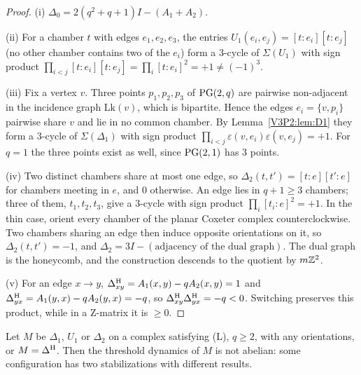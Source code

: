 \begin{proof}
(i) $\Delta_0=2(q^{2}+q+1)I-(A_1+A_2)$.

(ii) For a chamber $t$ with edges $e_1,e_2,e_3$, the entries $U_1(e_i,e_j)=[t:e_i][t:e_j]$
(no other chamber contains two of the $e_i$) form a $3$-cycle of $\Sigma(U_1)$ with sign
product $\prod_{i<j}[t:e_i][t:e_j]=\prod_i[t:e_i]^{2}=+1\neq(-1)^{3}$.

(iii) Fix a vertex $v$. Three points $p_1,p_2,p_3$ of $\mathrm{PG}(2,q)$ are pairwise non-adjacent
in the incidence graph $\mathrm{Lk}(v)$, which is bipartite. Hence the edges $e_i=\{v,p_i\}$
pairwise share $v$ and lie in no common chamber. By Lemma~\ref{V3P2:lem:D1} they form a
$3$-cycle of $\Sigma(\Delta_1)$ with sign product
$\prod_{i<j}\varepsilon(v,e_i)\varepsilon(v,e_j)=+1$. For $q=1$ the three points exist as
well, since $\mathrm{PG}(2,1)$ has $3$ points.

(iv) Two distinct chambers share at most one edge, so
$\Delta_2(t,t')=[t:e][t':e]$ for chambers meeting in $e$, and $0$ otherwise. An edge lies in
$q+1\ge3$ chambers; three of them, $t_1,t_2,t_3$, give a $3$-cycle with sign product
$\prod_i[t_i:e]^{2}=+1$. In the thin case, orient every chamber of the planar Coxeter complex
counterclockwise. Two chambers sharing an edge then induce opposite orientations on it, so
$\Delta_2(t,t')=-1$, and $\Delta_2=3I-(\text{adjacency of the dual graph})$. The dual graph is
the honeycomb, and the construction descends to the quotient by $m\mathbb{Z}^{2}$.

(v) For an edge $x\to y$, $\Delta^{\mathrm{H}}_{xy}=A_1(x,y)-qA_2(x,y)=1$ and
$\Delta^{\mathrm{H}}_{yx}=A_1(y,x)-qA_2(y,x)=-q$, so $\Delta^{\mathrm{H}}_{xy}\Delta^{\mathrm{H}}_{yx}=-q<0$. Switching preserves
this product, while in a Z-matrix it is $\ge0$.
\end{proof}

\begin{corollary}\label{V3P2:cor:nonabelian}
Let $M$ be $\Delta_1$, $U_1$ or $\Delta_2$ on a complex satisfying \textup{(L)}, $q\ge2$, with
any orientations, or $M=\Delta^{\mathrm{H}}$. Then the threshold dynamics of $M$ is not abelian: some
configuration has two stabilizations with different results.
\end{corollary}

